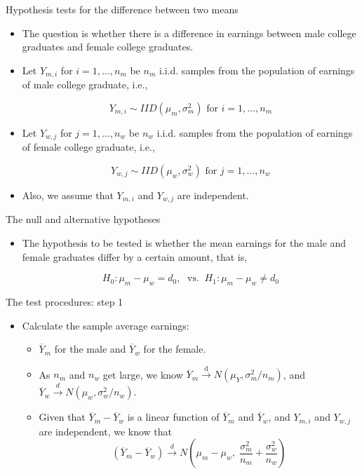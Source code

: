 \documentclass[presentation]{beamer}
\begin{document}
\begin{frame}[label={sec:orga4d4622}]{Hypothesis tests for the difference between two means}
\begin{itemize}
\item The question is whether there is a difference
in earnings between male college graduates and female college
graduates.

\item Let \(Y_{m, i}\) for \(i=1, \ldots, n_m\) be \(n_m\) i.i.d. samples from the
population of earnings of male college graduate, i.e., 

\[ Y_{m,i} \sim IID(\mu_m, \sigma^2_m)  \text{ for } i=1,\ldots,n_m \]

\item Let \(Y_{w, j}\) for \(j=1, \ldots, n_w\) be \(n_w\) i.i.d. samples from
the population of earnings of female college graduate, i.e.,

\[ Y_{w,j} \sim IID(\mu_w, \sigma^2_w)  \text{ for } j=1,\ldots,n_w \]

\item Also, we assume that \(Y_{m,i}\) and \(Y_{w,j}\) are independent.
\end{itemize}
\end{frame}

\begin{frame}[label={sec:org17000cd}]{The null and alternative hypotheses}
\begin{itemize}
\item The hypothesis to be tested is whether the mean earnings for the male and
female graduates differ by a certain amount, that is, 

\[ H_0: \mu_m - \mu_w = d_0,\; \text{ vs. }\: H_1: \mu_m - \mu_w \neq d_0 \]
\end{itemize}
\end{frame}

\begin{frame}[label={sec:org861ab74}]{The test procedures: step 1}
\begin{itemize}
\item Calculate the sample average earnings:

\begin{itemize}
\item \(\overline{Y}_m\) for the
male and \(\overline{Y}_w\) for the female.

\item As \(n_m\) and \(n_w\) get large, we know \(\overline{Y}_m
    \xrightarrow{\text{ d }} N(\mu_Y, \sigma^2_m/n_m)\), and
\(\overline{Y}_w \xrightarrow{d} N(\mu_w, \sigma^2_w / n_w)\).

\item Given that \(\overline{Y}_m - \overline{Y}_w\) is a linear function
of \(\overline{Y}_m\) and \(\overline{Y}_w\), and \(Y_{m,i}\) and
\(Y_{w,j}\) are independent, we know that 
\[(\overline{Y}_m - \overline{Y}_w) \xrightarrow{d} N(\mu_m -
    \mu_w,\; \frac{\sigma^2_m}{n_m} + \frac{\sigma^2_w}{n_w}) \]
\end{itemize}
\end{itemize}
\end{frame}
\end{document}
